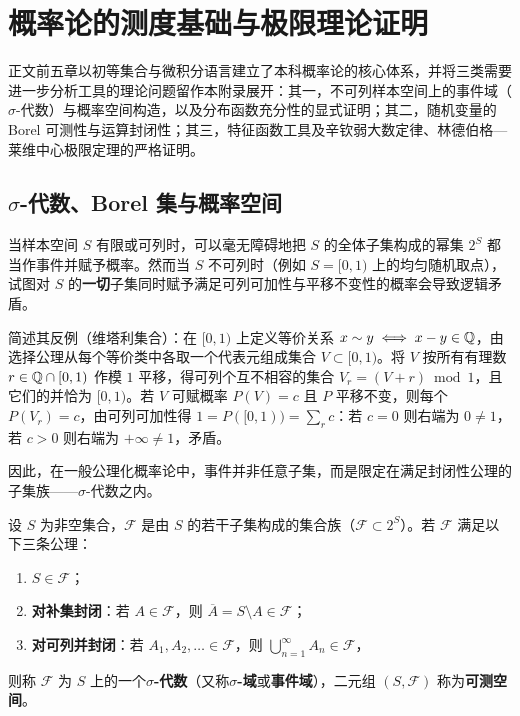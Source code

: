 %
%

\chapter{概率论的测度基础与极限理论证明}
\label{app:foundations}

正文前五章以初等集合与微积分语言建立了本科概率论的核心体系，并将三类需要进一步分析工具的理论问题留作本附录展开：其一，不可列样本空间上的事件域（$\sigma$-代数）与概率空间构造，以及分布函数充分性的显式证明；其二，随机变量的 Borel 可测性与运算封闭性；其三，特征函数工具及辛钦弱大数定律、林德伯格—莱维中心极限定理的严格证明。

\section{\texorpdfstring{$\sigma$}{σ}-代数、Borel 集与概率空间}
\label{sec:app-sigma-algebra}

当样本空间 $S$ 有限或可列时，可以毫无障碍地把 $S$ 的全体子集构成的幂集 $2^S$ 都当作事件并赋予概率。然而当 $S$ 不可列时（例如 $S=[0,1)$ 上的均匀随机取点），试图对 $S$ 的\textbf{一切}子集同时赋予满足可列可加性与平移不变性的概率会导致逻辑矛盾。

简述其反例（维塔利集合）：在 $[0,1)$ 上定义等价关系 $x\sim y\iff x-y\in\mathbb{Q}$，由选择公理从每个等价类中各取一个代表元组成集合 $V\subset[0,1)$。将 $V$ 按所有有理数 $r\in\mathbb{Q}\cap[0,1)$ 作模 $1$ 平移，得可列个互不相容的集合 $V_r=(V+r)\bmod 1$，且它们的并恰为 $[0,1)$。若 $V$ 可赋概率 $P(V)=c$ 且 $P$ 平移不变，则每个 $P(V_r)=c$，由可列可加性得 $1=P([0,1))=\sum_{r}c$：若 $c=0$ 则右端为 $0\ne 1$，若 $c>0$ 则右端为 $+\infty\ne 1$，矛盾。

因此，在一般公理化概率论中，事件并非任意子集，而是限定在满足封闭性公理的子集族——$\sigma$-代数之内。

\begin{definition}[$\sigma$-代数]
\label{def:sigma-algebra}
设 $S$ 为非空集合，$\mathcal{F}$ 是由 $S$ 的若干子集构成的集合族（$\mathcal{F}\subset 2^S$）。若 $\mathcal{F}$ 满足以下三条公理：
\begin{enumerate}
  \item $S\in\mathcal{F}$；
  \item \textbf{对补集封闭}：若 $A\in\mathcal{F}$，则 $\overline{A}=S\setminus A\in\mathcal{F}$；
  \item \textbf{对可列并封闭}：若 $A_1,A_2,\ldots\in\mathcal{F}$，则 $\bigcup_{n=1}^{\infty}A_n\in\mathcal{F}$，
\end{enumerate}
则称 $\mathcal{F}$ 为 $S$ 上的一个\textbf{$\sigma$-代数}（又称\textbf{$\sigma$-域}或\textbf{事件域}），二元组 $(S,\mathcal{F})$ 称为\textbf{可测空间}。
\end{definition}


